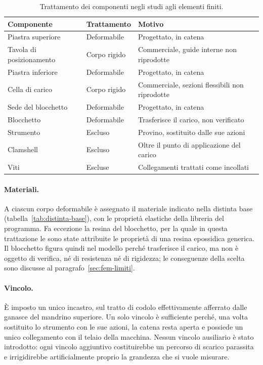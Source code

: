 \begin{table}[!tb]
    \centering
    \caption{Trattamento dei componenti negli studi agli elementi finiti.}
    \label{tab:modello-fem}
    \footnotesize
    \setlength{\tabcolsep}{4pt}
    \begin{tabularx}{\linewidth}{@{}
        >{\hsize=1.0\hsize\raggedright\arraybackslash}X
        >{\hsize=0.75\hsize\raggedright\arraybackslash}X
        >{\hsize=1.25\hsize\raggedright\arraybackslash}X@{}}
        \toprule
        Componente & Trattamento & Motivo \\
        \midrule
        Piastra superiore & Deformabile & Progettato, in catena \\
        Tavola di posizionamento & Corpo rigido & Commerciale, guide interne non riprodotte \\
        Piastra inferiore & Deformabile & Progettato, in catena \\
        Cella di carico & Corpo rigido & Commerciale, sezioni flessibili non riprodotte \\
        Sede del blocchetto & Deformabile & Progettato, in catena \\
        Blocchetto & Deformabile & Trasferisce il carico, non verificato \\
        Strumento & Escluso & Provino, sostituito dalle sue azioni \\
        Clamshell & Escluso & Oltre il punto di applicazione del carico \\
        Viti & Escluse & Collegamenti trattati come incollati \\
        \bottomrule
    \end{tabularx}
\end{table}

\paragraph{Materiali.}
A ciascun corpo deformabile è assegnato il materiale indicato nella distinta
base (tabella~\ref{tab:distinta-base}), con le proprietà elastiche della
libreria del programma. Fa eccezione la resina del blocchetto, per la quale in questa trattazione le sono state attribuite le
proprietà di una resina epossidica generica. Il blocchetto figura quindi nel
modello perché trasferisce il carico, ma non è oggetto di verifica, né di
resistenza né di rigidezza; le conseguenze della scelta sono discusse al
paragrafo~\ref{sec:fem-limiti}.

\paragraph{Vincolo.}
È imposto un unico incastro, sul tratto di codolo effettivamente afferrato dalle
ganasce del mandrino superiore. Un solo vincolo è sufficiente perché, una volta
sostituito lo strumento con le sue azioni, la catena resta aperta e possiede un
unico collegamento con il telaio della macchina. Nessun vincolo ausiliario è
stato introdotto: ogni vincolo aggiuntivo costituirebbe un percorso di scarico
parassita e irrigidirebbe artificialmente proprio la grandezza che si vuole
misurare.

